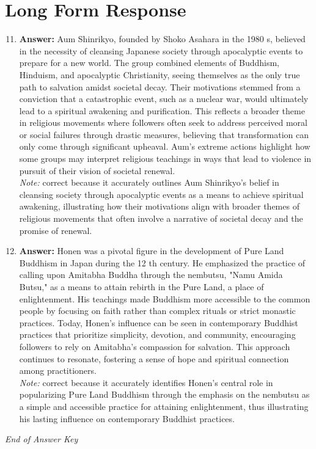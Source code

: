 \documentclass[12pt]{article}
\begin{document}
\section*{Long Form Response}
\begin{enumerate}[label=\arabic*.]
\setcounter{enumi}{10}
\item \textbf{Answer:} Aum Shinrikyo, founded by Shoko Asahara in the 1980 s, believed in the necessity of cleansing Japanese society through apocalyptic events to prepare for a new world. The group combined elements of Buddhism, Hinduism, and apocalyptic Christianity, seeing themselves as the only true path to salvation amidst societal decay. Their motivations stemmed from a conviction that a catastrophic event, such as a nuclear war, would ultimately lead to a spiritual awakening and purification. This reflects a broader theme in religious movements where followers often seek to address perceived moral or social failures through drastic measures, believing that transformation can only come through significant upheaval. Aum's extreme actions highlight how some groups may interpret religious teachings in ways that lead to violence in pursuit of their vision of societal renewal.
\\ \textit{Note:} correct because it accurately outlines Aum Shinrikyo's belief in cleansing society through apocalyptic events as a means to achieve spiritual awakening, illustrating how their motivations align with broader themes of religious movements that often involve a narrative of societal decay and the promise of renewal.
\item \textbf{Answer:} Honen was a pivotal figure in the development of Pure Land Buddhism in Japan during the 12 th century. He emphasized the practice of calling upon Amitabha Buddha through the nembutsu, "Namu Amida Butsu," as a means to attain rebirth in the Pure Land, a place of enlightenment. His teachings made Buddhism more accessible to the common people by focusing on faith rather than complex rituals or strict monastic practices. Today, Honen's influence can be seen in contemporary Buddhist practices that prioritize simplicity, devotion, and community, encouraging followers to rely on Amitabha's compassion for salvation. This approach continues to resonate, fostering a sense of hope and spiritual connection among practitioners.
\\ \textit{Note:} correct because it accurately identifies Honen's central role in popularizing Pure Land Buddhism through the emphasis on the nembutsu as a simple and accessible practice for attaining enlightenment, thus illustrating his lasting influence on contemporary Buddhist practices.
\end{enumerate}

\vfill
\noindent\textit{End of Answer Key}
\end{document}
